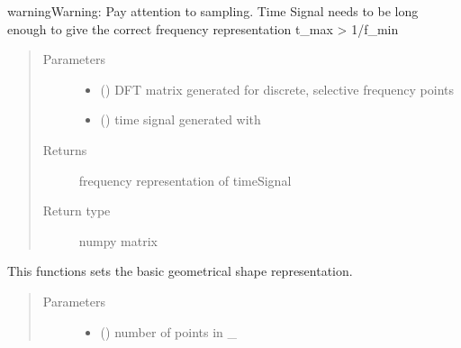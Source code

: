\documentclass[letterpaper,10pt,english]{sphinxmanual}
\begin{document}
\begin{fulllineitems}
\begin{fulllineitems}
\begin{sphinxadmonition}{warning}{Warning:}
Pay attention to sampling. Time Signal needs to be long enough to give the correct frequency representation t\_max \textgreater{} 1/f\_min
\end{sphinxadmonition}
\begin{quote}\begin{description}
\item[{Parameters}] \leavevmode\begin{itemize}
\item {} 
 () \textendash{} DFT matrix generated for discrete, selective frequency points

\item {} 
 () \textendash{} time signal generated with 

\end{itemize}

\item[{Returns}] \leavevmode
frequency representation of timeSignal

\item[{Return type}] \leavevmode
numpy matrix

\end{description}\end{quote}

\end{fulllineitems}


\begin{fulllineitems}
\label{\detokenize{FIT:FIT.FIT.setGeometry}}
This functions sets the basic geometrical shape representation.
\begin{quote}\begin{description}
\item[{Parameters}] \leavevmode\begin{itemize}
\item {} 
 () \textendash{} number of points in \_


\end{itemize}
\end{description}
\end{quote}
\end{fulllineitems}
\end{fulllineitems}
\end{document}
